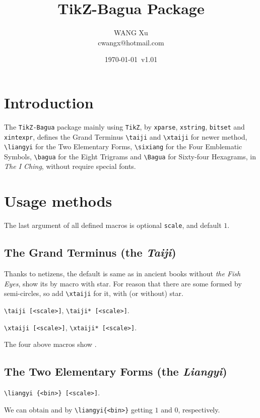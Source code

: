 \documentclass{article}
\title{TikZ-Bagua Package}
\author{WANG Xu \\ cwangx@hotmail.com}
\date{\today~v1.01}
\begin{document}
\maketitle

\section{Introduction}

The \verb+TikZ-Bagua+ package mainly using \verb+TikZ+, by \verb+xparse+, \verb+xstring+, \verb+bitset+ and \verb+xintexpr+, defines the Grand Terminus \cite{Legge} \verb+\taiji+ and \verb+\xtaiji+ for newer method, \verb+\liangyi+ for the Two Elementary Forms, \verb+\sixiang+ for the Four Emblematic Symbols, \verb+\bagua+ for the Eight Trigrams and \verb+\Bagua+ for Sixty-four Hexagrams,  in \emph{The I Ching}, without require special fonts.

\section{Usage methods}

The last argument of all defined macros is optional \verb|scale|, and default $1$.

\subsection{The Grand Terminus (the \emph{Taiji})}

Thanks to netizens, the default is same as in ancient books without \emph{the Fish Eyes}, show its by macro with star.
For reason that there are some formed by semi-circles, so add \verb+\xtaiji+ for it, with (or without) star.

\verb+\taiji [<scale>]+, \verb+\taiji* [<scale>]+.

\verb+\xtaiji [<scale>]+, \verb+\xtaiji* [<scale>]+.

The four above macros show \taiji \taiji* \xtaiji \xtaiji*.

\subsection{The Two Elementary Forms (the \emph{Liangyi})}
\verb+\liangyi {<bin>} [<scale>]+.

We can obtain  and  by \verb+\liangyi{<bin>}+ getting $1$ and $0$, respectively.
\end{document}
